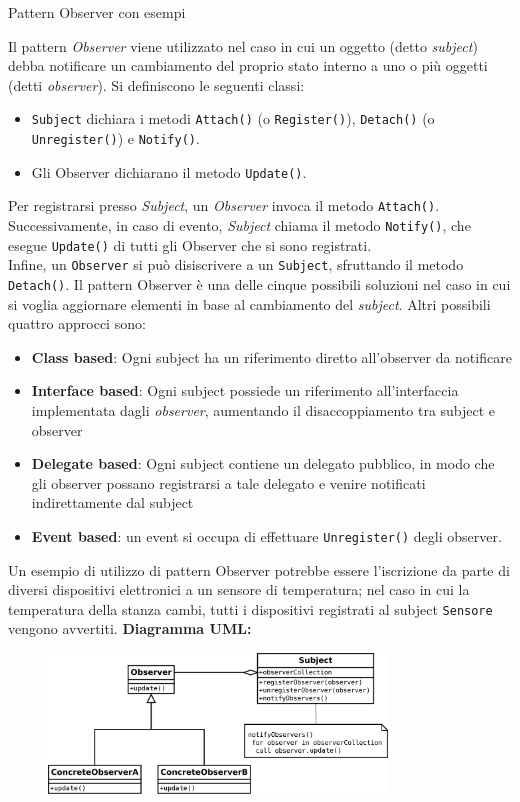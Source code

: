 \begin{problem}{1.18}
Pattern Observer con esempi
\end{problem}
\begin{solution}
Il pattern \textit{Observer} viene utilizzato nel caso in cui un oggetto (detto \textit{subject}) debba notificare un cambiamento del proprio stato interno a uno o più oggetti (detti \textit{observer}).
Si definiscono le seguenti classi:
\begin{itemize}
	\item \texttt{Subject} dichiara i metodi \texttt{Attach()} (o \texttt{Register()}), \texttt{Detach()} (o
	\texttt{Unregister()}) e \texttt{Notify()}.
	\item Gli Observer dichiarano il metodo \texttt{Update()}.
\end{itemize}
Per registrarsi presso \textit{Subject}, un \textit{Observer} invoca il metodo \texttt{Attach()}.
Successivamente, in caso di evento, \textit{Subject} chiama il metodo \texttt{Notify()}, che esegue \texttt{Update()} di tutti gli Observer che si sono registrati.
\\Infine, un \texttt{Observer} si può disiscrivere a un \texttt{Subject}, sfruttando il metodo \texttt{Detach()}.
\newline
Il pattern Observer è una delle cinque possibili soluzioni nel caso in cui si voglia aggiornare elementi in base al cambiamento del \textit{subject}.
Altri possibili quattro approcci sono:
\begin{itemize}
	\item \textbf{Class based}: Ogni subject ha un riferimento diretto all'observer da notificare
	\item \textbf{Interface based}: Ogni subject possiede un riferimento all'interfaccia implementata dagli \textit{observer}, aumentando il disaccoppiamento tra subject e observer
	\item \textbf{Delegate based}: Ogni subject contiene un delegato pubblico, in modo che gli observer possano registrarsi a tale delegato e venire notificati indirettamente dal subject
	\item \textbf{Event based}: un event si occupa di effettuare \texttt{Unregister()} degli observer.
\end{itemize}
\raggedright Un esempio di utilizzo di pattern Observer potrebbe essere l'iscrizione da parte di diversi dispositivi elettronici a un sensore di temperatura; nel caso in cui la temperatura della stanza cambi, tutti i dispositivi registrati al subject \texttt{Sensore} vengono avvertiti.
\newline
\textbf{Diagramma UML:}
\begin{figure}[htb!]
	\centering
	\includegraphics[width=9cm]{./immagini/observerPattern.png}
\end{figure}
\end{solution}


